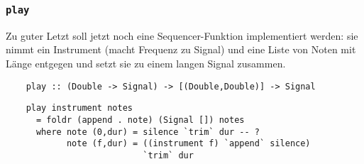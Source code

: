 \documentclass{beamer}
\begin{document}
\begin{frame}[fragile]
  \frametitle{\lstinline{play}}
  Zu guter Letzt soll jetzt noch eine Sequencer-Funktion implementiert werden:
  sie nimmt ein Instrument (macht Frequenz zu Signal)
  und eine Liste von Noten mit Länge entgegen
  und setzt sie zu einem langen Signal zusammen.
  \begin{lstlisting}
    play :: (Double -> Signal) -> [(Double,Double)] -> Signal
  \end{lstlisting}
  \pause
  \begin{lstlisting}
    play instrument notes
      = foldr (append . note) (Signal []) notes
      where note (0,dur) = silence `trim` dur -- ?
            note (f,dur) = ((instrument f) `append` silence)
                           `trim` dur
  \end{lstlisting}
\end{frame}
\end{document}
